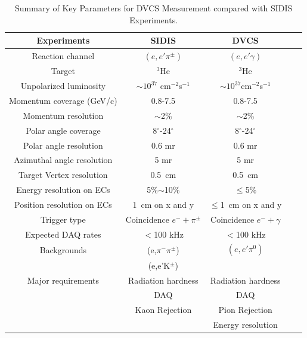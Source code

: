 \begin{table}\centering
\begin{tabular}{|c|c|c|c|c|}
\hline
Experiments                             & SIDIS                 & DVCS  \\\hline
Reaction channel                        &  $(e,e'\pi^{\pm})$    & $(e,e'\gamma)$	\\\hline
Target                                  & $^3$He                & $^3$He 	\\\hline
Unpolarized luminosity                  & $\sim10^{37}$ cm$^{-2}$s$^{-1}$        & $\sim10^{37}$cm$^{-2}$s$^{-1}$	\\\hline 
Momentum coverage (GeV/c)               & 0.8-7.5               &0.8-7.5 	\\\hline
Momentum resolution                     &  $\sim$2\%            & $\sim$2\%	\\\hline
Polar angle coverage                    &  8$^{\circ}$-24$^{\circ}$                 &  8$^{\circ}$-24$^{\circ}$ 	\\\hline
Polar angle resolution                  & 0.6 mr                & 0.6 mr 	\\\hline
Azimuthal angle resolution              & 5 mr                  & 5 mr 	\\\hline
Target Vertex resolution                & 0.5~cm                & 0.5~cm \\\hline
 Energy resolution on ECs       & 5\%$\sim$10\%         & $\leq$5\%   \\\hline
 Position resolution on ECs     & 1~cm on x and y       & $\leq$1~cm on x and y   \\\hline
Trigger type                            & Coincidence $e^-+\pi^{\pm}$ & Coincidence $e^-+\gamma$\\\hline
Expected DAQ rates                      &  $<$100 kHz           &  $<$100 kHz 	\\\hline
Backgrounds                             & (e,$\pi^-\pi^{\pm}$)  &$(e,e'\pi^{0})$ \\
                                        &   (e,e'K$^\pm$)       &	\\\hline
Major requirements                      &  Radiation hardness   & Radiation hardness	\\
                                        &  DAQ                  & DAQ      \\
                                        &  Kaon Rejection       & Pion Rejection	\\
                                        &                       & Energy resolution  \\\hline
\end{tabular}
\caption{\footnotesize{Summary of Key Parameters for DVCS Measurement compared with SIDIS Experiments.}}\label{table:program_summary}
\label{table:key_par_sidis_dvcs}
\end{table} 

